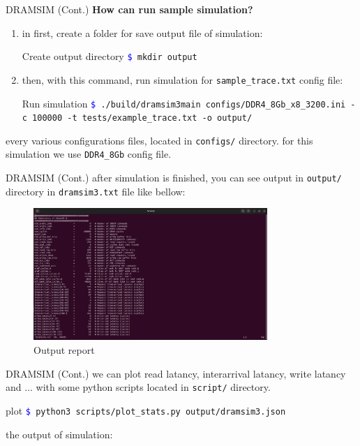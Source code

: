 \documentclass{beamer}
\begin{document}
\begin{frame}{DRAMSIM (Cont.)}
	\textbf{How can run sample simulation?}\\
	\begin{enumerate}
		\item in first, create a folder for save output file of simulation:
		\begin{block}{Create output directory}
			\texttt{\textcolor{blue}{\$} ‫‪‬‬‫‪mkdir output‬‬‬‬} \\
		\end{block}
		
		\item then, with this command, run simulation for \texttt{sample\_trace.txt} config file:
		\begin{block}{Run simulation}
			\texttt{\textcolor{blue}{\$} ‫‪./build/dramsim3main‬‬ ‫‪configs/DDR4\_8Gb\_x8\_3200.ini -c‬‬‬‬‬‬ 100000 -t tests/‫‪example\_trace.txt‬‬ -o output/} \\
		\end{block}		
	\end{enumerate}
	every various configurations files, located in \texttt{configs/} directory. for this simulation we use \texttt{DDR4\_8Gb} config file.
\end{frame}


\begin{frame}{DRAMSIM (Cont.)}
	after simulation is finished, you can see output in \texttt{output/} directory in \texttt{dramsim3.txt} file like bellow:
	\begin{figure}
		\centering
		\includegraphics[height=5cm]{images/img12_2}
		\caption{Output report}
		\label{fig:Output report of DRAMSim}
	\end{figure}
\end{frame}



\begin{frame}{DRAMSIM (Cont.)}
	we can plot read latancy, interarrival latancy, write latancy and ... with some python scripts located in \texttt{script/} directory.
	
	\begin{block}{plot}
		\texttt{\textcolor{blue}{\$} python3 scripts/plot\_stats.py output/dramsim3.json‬‬} \\
	\end{block}
	
	the output of simulation:	
\end{frame}
\end{document}
